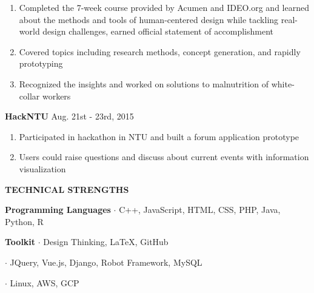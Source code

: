 \documentclass[12pt]{article}
\begin{document}
	\begin{enumerate}

		\item Completed the 7-week course provided by Acumen and IDEO.org and learned about the methods and tools of human-centered design while tackling real-world design challenges, earned official statement of accomplishment

		\item Covered topics including research methods, concept generation, and rapidly prototyping

		\item Recognized the insights and worked on solutions to malnutrition of white-collar workers

	\end{enumerate}

	\vspace{0.5em}

	\textbf{HackNTU} \hfill Aug. 21st - 23rd, 2015

	\begin{enumerate}

		\item Participated in hackathon in NTU and built a forum application prototype

		\item Users could raise questions and discuss about current events with information visualization

	\end{enumerate}

	\vspace{1em}

\textbf{\large{\uppercase{Technical Strengths}}}
\hrulefill{}

	\vspace{0.5em}

	\textbf{Programming Languages} \hfill $\cdot$ C++, JavaScript, HTML, CSS, PHP, Java, Python, R

	\vspace{0.5em}

	\textbf{Toolkit} \hfill $\cdot$ Design Thinking, LaTeX, GitHub

	\hfill $\cdot$ JQuery, Vue.js, Django, Robot Framework, MySQL

	\hfill $\cdot$ Linux, AWS, GCP
\end{document}
